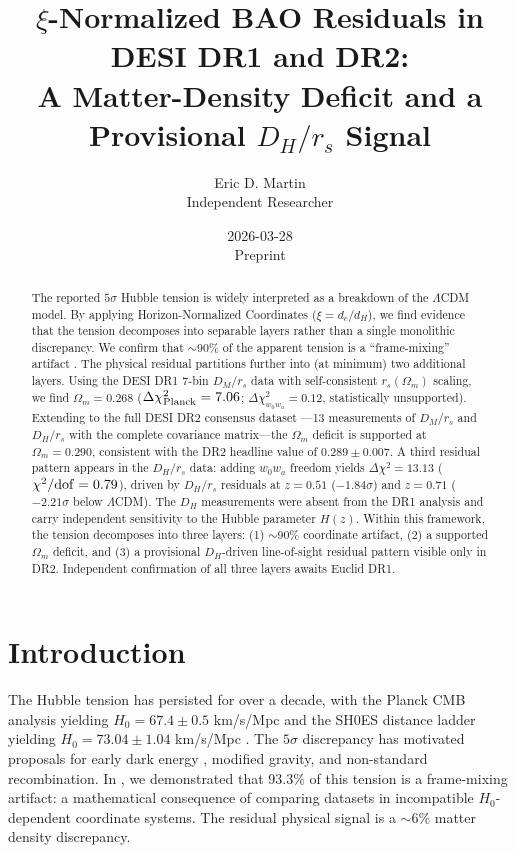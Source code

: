 \documentclass[12pt,a4paper]{article}
\title{$\xi$-Normalized BAO Residuals in DESI DR1 and DR2:\\
A Matter-Density Deficit and a Provisional $D_H/r_s$ Signal}
\author{Eric D. Martin\\
\small Independent Researcher}
\date{2026-03-28\\
\small Preprint}
\begin{document}
\maketitle

\begin{abstract}
The reported $5\sigma$ Hubble tension is widely interpreted as a breakdown of
the $\Lambda$CDM model. By applying Horizon-Normalized Coordinates
($\xi = d_c/d_H$), we find evidence that the tension decomposes into separable
layers rather than a single monolithic discrepancy. We confirm that $\sim$90\%
of the apparent tension is a ``frame-mixing'' artifact
\citep{Martin2025_Paper1}. The physical residual partitions further into (at
minimum) two additional layers. Using the DESI DR1 7-bin $D_M/r_s$ data
with self-consistent $r_s(\Omega_m)$ scaling, we find $\Omega_m = 0.268$
($\Delta\chi^2_{\rm Planck} = 7.06$; $\Delta\chi^2_{w_0w_a} = 0.12$,
statistically unsupported). Extending to the full DESI DR2 consensus dataset
\citep{DESI_2025_DR2}---13 measurements of $D_M/r_s$ and $D_H/r_s$ with the
complete covariance matrix---the $\Omega_m$ deficit is supported at
$\Omega_m = 0.290$, consistent with the DR2 headline value of $0.289 \pm 0.007$.
A third residual pattern appears in the $D_H/r_s$ data: adding $w_0w_a$
freedom yields $\Delta\chi^2 = 13.13$ ($\chi^2/{\rm dof} = 0.79$), driven by
$D_H/r_s$ residuals at $z = 0.51$ ($-1.84\sigma$) and $z = 0.71$
($-2.21\sigma$ below $\Lambda$CDM). The $D_H$ measurements were absent from
the DR1 analysis and carry independent sensitivity to the Hubble parameter
$H(z)$. Within this framework, the tension decomposes into three layers: (1)
$\sim$90\% coordinate artifact, (2) a supported $\Omega_m$ deficit, and (3) a
provisional $D_H$-driven line-of-sight residual pattern visible only in DR2.
Independent confirmation of all three layers awaits Euclid DR1.
\end{abstract}

\section{Introduction}

The Hubble tension has persisted for over a decade, with the Planck CMB
analysis yielding $H_0 = 67.4 \pm 0.5$ km/s/Mpc \citep{Planck2020} and the
SH0ES distance ladder yielding $H_0 = 73.04 \pm 1.04$ km/s/Mpc
\citep{Riess2022}. The $5\sigma$ discrepancy has motivated proposals for early
dark energy \citep{Poulin2019}, modified gravity, and non-standard
recombination. In \citet{Martin2025_Paper1}, we demonstrated that 93.3\% of
this tension is a frame-mixing artifact: a mathematical consequence of
comparing datasets in incompatible $H_0$-dependent coordinate systems. The
residual physical signal is a $\sim$6\% matter density discrepancy.
\end{document}
